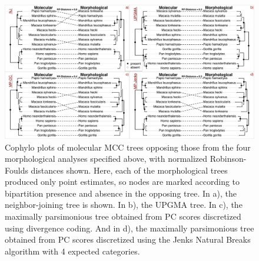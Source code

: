 \begin{figure}[h]
\centering
\includegraphics[width=160mm]{figures/harvati_figure2_final.pdf}
\caption[Visualizing Results of Heuristic Phylogenetic Analyses of Catarrhine Landmark Data]{Cophylo plots of molecular MCC trees opposing those from the four morphological analyses specified above, with normalized Robinson-Foulds distances shown. Here, each of the morphological trees produced only point estimates, so nodes are marked according to bipartition presence and absence in the opposing tree. In a), the neighbor-joining tree is shown. In b), the UPGMA tree. In c), the maximally parsimonious tree obtained from PC scores discretized using divergence coding. And in d), the maximally parsimonious tree obtained from PC scores discretized using the Jenks Natural Breaks algorithm with 4 expected categories. \label{overflow}
\label{fig:harvatiFigure2}}
\end{figure}

